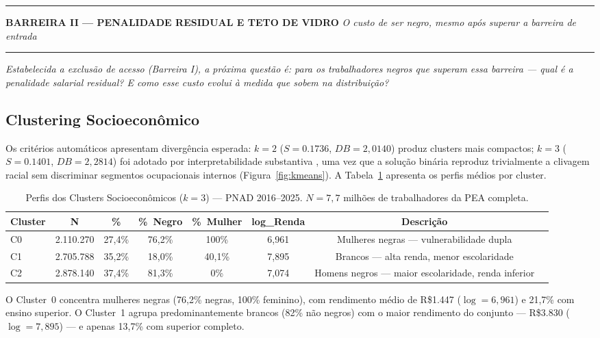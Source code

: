 \documentclass[12pt, a4paper, oneside]{article}
\begin{document}
\noindent\rule{\textwidth}{1pt}
\textbf{\large BARREIRA II --- PENALIDADE RESIDUAL E TETO DE VIDRO}
\textit{O custo de ser negro, mesmo após superar a barreira de entrada}
\noindent\rule{\textwidth}{1pt}

\medskip

\textit{Estabelecida a exclusão de acesso (Barreira I), a próxima questão é:
para os trabalhadores negros que superam essa barreira --- qual é a penalidade
salarial residual? E como esse custo evolui à medida que sobem na distribuição?}

\subsection{Clustering Socioeconômico}
\label{subsec:clustering}

Os critérios automáticos apresentam divergência esperada:
$k=2$ ($S=0.1736$, $DB=2,0140$) produz
clusters mais compactos; $k=3$ ($S=0.1401$,
$DB=2,2814$) foi adotado por interpretabilidade substantiva
\cite{ketchen1996}, uma vez que a solução binária reproduz trivialmente a
clivagem racial sem discriminar segmentos ocupacionais internos
(Figura~\ref{fig:kmeans}). A Tabela~\ref{tab:kmeans_perfis} apresenta os
perfis médios por cluster.

\begin{table}[H]
\centering
\caption{Perfis dos Clusters Socioeconômicos ($k=3$) --- PNAD 2016--2025.
          $N=7{,}7$ milhões de trabalhadores da PEA completa.}
\label{tab:kmeans_perfis}
\begin{tabular}{lccccccc}
\toprule
\textbf{Cluster} & \textbf{N} & \textbf{\%} & \textbf{\%~Negro} &
\textbf{\%~Mulher} & \textbf{log\_Renda} & \textbf{Descrição} \\
\midrule
C0 & 2.110.270 & 27,4\% & 76,2\%  & 100\% & 6,961 &
  Mulheres negras --- vulnerabilidade dupla \\
C1 & 2.705.788 & 35,2\% & 18,0\%  & \phantom{0}40,1\%  & 7,895 &
  Brancos --- alta renda, menor escolaridade \\
C2 & 2.878.140 & 37,4\% & 81,3\%  & \phantom{00}0\% & 7,074 &
  Homens negros --- maior escolaridade, renda inferior \\
\bottomrule
\end{tabular}
\end{table}

O Cluster~0 concentra mulheres negras (76,2\% negras,
100\% feminino), com rendimento médio de
R\$1.447 ($\log=6,961$) e
21,7\% com ensino superior.
O Cluster~1 agrupa predominantemente brancos (82\% não negros)
com o maior rendimento do conjunto --- R\$3.830
($\log=7,895$) ---
e apenas 13,7\% com superior completo.
\end{document}
